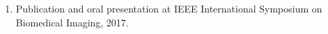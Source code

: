 \listofpublications


\noindent
\begin{enumerate}
    \item Publication and oral presentation at IEEE International Symposium on Biomedical Imaging, 2017.
\end{enumerate} 









